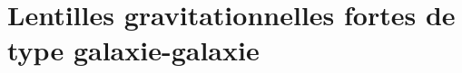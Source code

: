 


\section{Lentilles gravitationnelles fortes de type galaxie-galaxie}\label{sec:lentilles gravitationnelles}


